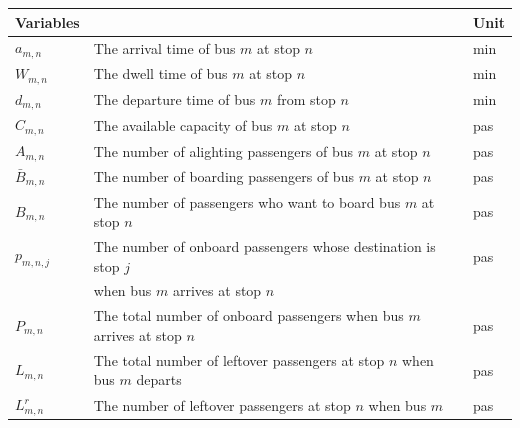 \documentclass[smallextended]{svjour3}       %
\begin{document}
\begin{Abstract}
\begin{table}[H]
  \begin{tabular}{p{1.5cm}p{7cm}p{1.1cm}}
    \hline
    Variables                       &                                                                                                                    & Unit\\ \hline
    $a_{m,n}$                       & The arrival time of bus $m$ at stop $n$                                                                            & min \\ 
    $W_{m,n}$                       & The dwell time of bus $m$ at stop $n$                                                                              & min \\ 
    $d_{m,n}$                       & The departure time of bus $m$ from stop $n$                                                                        & min \\ 
    $C_{m,n}$                       & The available capacity of bus $m$ at stop $n$                                                                      & pas \\ 
    $A_{m,n}$                       & The number of alighting passengers of bus $m$ at stop $n$                                                          & pas \\ 
    $\bar{B}_{m,n}$                 & The number of boarding passengers of bus $m$ at stop $n$                                                           & pas \\ 
    $B_{m,n}$                       & The number of passengers who want to board bus $m$ at stop $n$                                                     & pas \\ 
    $p_{m,n,j}$                     & The number of onboard passengers whose destination is stop $j$                                                     & pas \\ 
                                    & when bus $m$ arrives at stop $n$         \\ 
    $P_{m,n}$                       & The total number of onboard passengers when bus $m$ arrives at stop $n$                                            & pas \\ 
    $L_{m,n}$                       & The total number of leftover passengers at stop $n$ when bus $m$ departs                                           & pas \\ 
    $L_{m,n}^{r}$                   & The number of leftover passengers at stop $n$ when bus $m$                                                         & pas \\ 

\end{tabular}
\end{table}
\end{Abstract}
\end{document}
